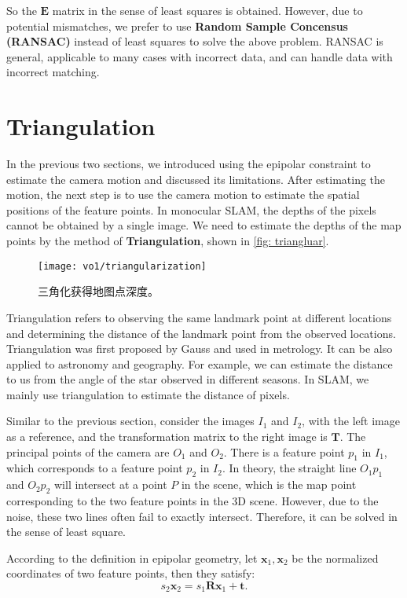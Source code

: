 So the $\mathbf{E}$ matrix in the sense of least squares is obtained. However, due to potential mismatches, we prefer to use \textbf{Random Sample Concensus (RANSAC)} instead of least squares to solve the above problem. RANSAC is general, applicable to many cases with incorrect data, and can handle data with incorrect matching.

\section{Triangulation}
In the previous two sections, we introduced using the epipolar constraint to estimate the camera motion and discussed its limitations. After estimating the motion, the next step is to use the camera motion to estimate the spatial positions of the feature points. In monocular SLAM, the depths of the pixels cannot be obtained by a single image. We need to estimate the depths of the map points by the method of \textbf{Triangulation}, shown in \autoref{fig: triangluar}.

\begin{figure}[!ht]
	\centering
	\texttt{[image: vo1/triangularization]}
	\caption{三角化获得地图点深度。}
	\label{fig:triangluar}
\end{figure}

Triangulation refers to observing the same landmark point at different locations and determining the distance of the landmark point from the observed locations. Triangulation was first proposed by Gauss and used in metrology. It can be also applied to astronomy and geography. For example, we can estimate the distance to us from the angle of the star observed in different seasons. In SLAM, we mainly use triangulation to estimate the distance of pixels.

Similar to the previous section, consider the images $I_{1}$ and $I_{2}$, with the left image as a reference, and the transformation matrix to the right image is $\mathbf{T}$. The principal points of the camera are $O_{1}$ and $O_{2}$. There is a feature point $p_{1}$ in $I_{1}$, which corresponds to a feature point $p_{2}$ in $I_{2}$. In theory, the straight line $O_{1}p_{1}$ and $O_{2}p_{2}$ will intersect at a point $P$ in the scene, which is the map point corresponding to the two feature points in the 3D scene. However, due to the noise, these two lines often fail to exactly intersect. Therefore, it can be solved in the sense of least square.

According to the definition in epipolar geometry, let $\mathbf{x}_1, \mathbf{x}_2$ be the normalized coordinates of two feature points, then they satisfy:
\begin{equation}
s_2 \mathbf{x}_2 = s_1  \mathbf{R} \mathbf{x}_1 + \mathbf{t}.  
\end{equation}

